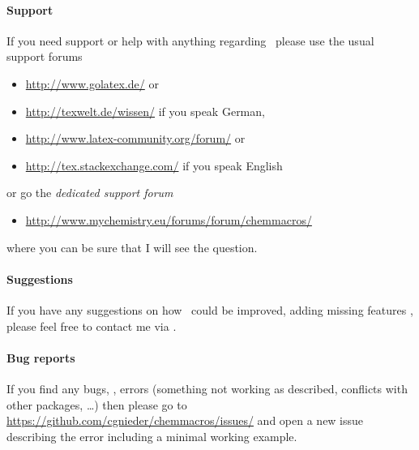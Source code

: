 \documentclass[load-preamble+]{cnltx-doc}
\begin{document}
\paragraph{Support}
If you need support or help with anything regarding \chemmacros\ please use
the usual support forums
\begin{itemize}
  \item \url{http://www.golatex.de/} or
  \item \url{http://texwelt.de/wissen/} if you speak German,
  \item \url{http://www.latex-community.org/forum/} or
  \item \url{http://tex.stackexchange.com/} if you speak English
\end{itemize}
or go the \emph{dedicated support forum}
\begin{itemize}
  \item \url{http://www.mychemistry.eu/forums/forum/chemmacros/}
\end{itemize}
where you can be sure that I will see the question.
  
\paragraph{Suggestions}
If you have any suggestions on how \chemmacros\ could be improved, adding
missing features \etc, please feel free to contact me via
.

\paragraph{Bug reports}
If you find any bugs, \ie, errors (something not working as described,
conflicts with other packages, \ldots) then please go to
\url{https://github.com/cgnieder/chemmacros/issues/} and open a new issue
describing the error including a minimal working example.
\end{document}
